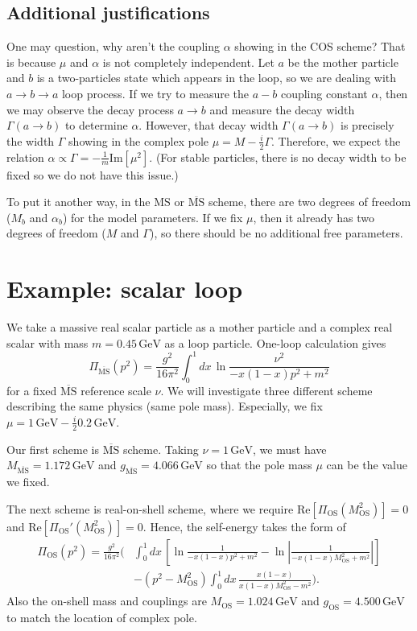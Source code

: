 \documentclass[11pt]{article}
\theoremstyle{definition}
\theoremstyle{remark}
\begin{document}
	\subsection{Additional justifications}
	One may question, why aren't the coupling $\alpha$ showing in the COS scheme?
	That is because $\mu$ and $\alpha$ is not completely independent.
	Let $a$ be the mother particle and $b$ is a two-particles state which appears in the loop, so we are dealing with $a\to b\to a$ loop process.
	If we try to measure the $a-b$ coupling constant $\alpha$, then we may observe the decay process $a\to b$ and measure the decay width $\Gamma(a\to b)$ to determine $\alpha$.
	However, that decay width $\Gamma(a\to b)$ is precisely the width $\Gamma$ showing in the complex pole $\mu=M-\frac{i}{2}\Gamma$.
	Therefore, we expect the relation $\alpha\propto\Gamma=-\frac{1}{m}\mathrm{Im}[\mu^{2}]$.
	(For stable particles, there is no decay width to be fixed so we do not have this issue.)
	
	To put it another way, in the $\mathrm{MS}$ or $\overline{\mathrm{MS}}$ scheme, there are two degrees of freedom ($M_{b}$ and $\alpha_{b}$) for the model parameters.
	If we fix $\mu$, then it already has two degrees of freedom ($M$ and $\Gamma$), so there should be no additional free parameters.
	
	\section{Example: scalar loop}
	We take a massive real scalar particle as a mother particle and a complex real scalar with mass $m=0.45\,\mathrm{GeV}$ as a loop particle.
	One-loop calculation gives
	\[\Pi_{\overline{\mathrm{MS}}}(p^{2})=\frac{g^{2}}{16\pi^{2}}\int_{0}^{1}dx\,\ln\frac{\nu^{2}}{-x(1-x)p^{2}+m^{2}}\]
	for a fixed $\overline{\mathrm{MS}}$ reference scale $\nu$.
	We will investigate three different scheme describing the same physics (same pole mass).
	Especially, we fix $\mu=1\,\mathrm{GeV}-\frac{i}{2}0.2\,\mathrm{GeV}$.
	
	Our first scheme is $\overline{\mathrm{MS}}$ scheme.
	Taking $\nu=1\,\mathrm{GeV}$, we must have $M_{\overline{\mathrm{MS}}}=1.172\,\mathrm{GeV}$ and $g_{\overline{\mathrm{MS}}}=4.066\,\mathrm{GeV}$ so that the pole mass $\mu$ can be the value we fixed.
	
	The next scheme is real-on-shell scheme, where we require $\mathrm{Re}[\Pi_{\mathrm{OS}}(M_{\mathrm{OS}}^{2})]=0$ and $\mathrm{Re}[\Pi_{\mathrm{OS}}'(M_{\mathrm{OS}}^{2})]=0$.
	Hence, the self-energy takes the form of
	\begin{align*}
		\Pi_{\mathrm{OS}}(p^{2})=\frac{g^{2}}{16\pi^{2}}\bigg(&\int_{0}^{1}dx\,\left[\ln\frac{1}{-x(1-x)p^{2}+m^{2}}-\ln\left|\frac{1}{-x(1-x)M_{\mathrm{OS}}^{2}+m^{2}}\right|\right]\\
		&-(p^{2}-M_{\mathrm{OS}}^{2})\int_{0}^{1}dx\,\frac{x(1-x)}{x(1-x)M_{\mathrm{OS}}^{2}-m^{2}}\bigg).
	\end{align*}
	Also the on-shell mass and couplings are $M_{\mathrm{OS}}=1.024\,\mathrm{GeV}$ and $g_{\mathrm{OS}}=4.500\,\mathrm{GeV}$ to match the location of complex pole.
	
\end{document}
